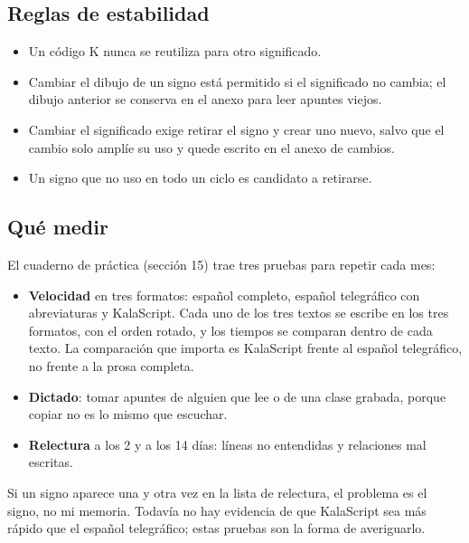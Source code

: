 \subsection{Reglas de estabilidad}
\begin{itemize}
\item Un código K nunca se reutiliza para otro significado.
\item Cambiar el dibujo de un signo está permitido si el significado no cambia;
 el dibujo anterior se conserva en el anexo para leer apuntes viejos.
\item Cambiar el significado exige retirar el signo y crear uno nuevo, salvo que
 el cambio solo amplíe su uso y quede escrito en el anexo de cambios.
\item Un signo que no uso en todo un ciclo es candidato a retirarse.
\end{itemize}

\subsection{Qué medir}
El cuaderno de práctica (sección 15) trae tres pruebas para repetir cada mes:
\begin{itemize}
\item \textbf{Velocidad} en tres formatos: español completo, español telegráfico
 con abreviaturas y KalaScript. Cada uno de los tres textos se escribe en los
 tres formatos, con el orden rotado, y los tiempos se comparan dentro de cada
 texto. La comparación que importa es KalaScript frente al español telegráfico,
 no frente a la prosa completa.
\item \textbf{Dictado}: tomar apuntes de alguien que lee o de una clase grabada,
 porque copiar no es lo mismo que escuchar.
\item \textbf{Relectura} a los 2 y a los 14 días: líneas no entendidas y
 relaciones mal escritas.
\end{itemize}
Si un signo aparece una y otra vez en la lista de relectura, el problema es el
signo, no mi memoria. Todavía no hay evidencia de que KalaScript sea más rápido
que el español telegráfico; estas pruebas son la forma de averiguarlo.

